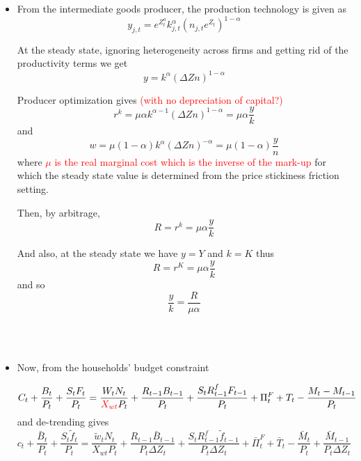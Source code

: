 \documentclass[11pt,titlepage]{article}
\begin{document}
\begin{itemize}
~\\~

\item From the intermediate goods producer, the production technology is given as
\begin{equation}
y_{j,t} = e^{Z_t^a} k_{j,t}^\alpha \left(n_{j,t} e^{Z_t} \right)^{1-\alpha}
\end{equation}

At the steady state, ignoring heterogeneity across firms and getting rid of the productivity terms we get
\begin{equation*}
y = k^\alpha \left(\Delta Z n\right)^{1-\alpha}
\end{equation*}

Producer optimization gives \textcolor{red}{(with no depreciation of capital?)}
\begin{equation}
r^{k} = \mu\alpha k^{\alpha-1} \left(\Delta Z n\right)^{1-\alpha} = \mu\alpha \frac{y}{k}
\end{equation}
and
\begin{equation}
w = \mu(1-\alpha) k^{\alpha} \left(\Delta Z n\right)^{-\alpha} = \mu(1-\alpha) \frac{y}{n}
\end{equation}
where \textcolor{red}{$\mu$ is the real marginal cost which is the inverse of the mark-up} for which the steady state value is determined from the price stickiness friction setting.

Then, by arbitrage,
\begin{equation*}
R = r^{k} = \mu\alpha \frac{y}{k}
\end{equation*}

And also, at the steady state we have $y=Y$ and $k=K$ thus
\begin{equation*}
R = r^{K} = \mu\alpha \frac{y}{k}
\end{equation*}
and so
\begin{equation}
\frac{y}{k} = \frac{R}{\mu\alpha}
\end{equation}

~\\~

\item Now, from the households' budget constraint

\begin{equation*}
C_t  + \frac{B_t}{P_t} + \frac{S_t F_t}{P_t}= \frac{W_t N_t} {\textcolor{red}{X_{wt}}P_t} + \frac{R_{t-1}B_{t-1}} {P_t} + \frac{S_t R_{t-1}^f F_{t-1}} {P_t} + \Pi_t^F + T_t - \frac{M_t - M_{t-1}}{P_t}
\end{equation*}
and de-trending gives
\begin{equation*}
c_t  + \frac{\bar{B}_t}{P_t} + \frac{S_t \tilde{f}_t}{P_t}= \frac{\tilde{w}_t N_t} {X_{wt}P_t} + \frac{R_{t-1}\bar{B}_{t-1}} {P_t \Delta Z_{t}} + \frac{S_t R_{t-1}^f \tilde{f}_{t-1}} {P_t \Delta Z_{t}} + \bar{\Pi}_t^F + \bar{T}_t - \frac{\bar{M}_t}{P_t} + \frac{\bar{M}_{t-1}}{P_t \Delta Z_{t}}
\end{equation*}


\end{itemize}
\end{document}
